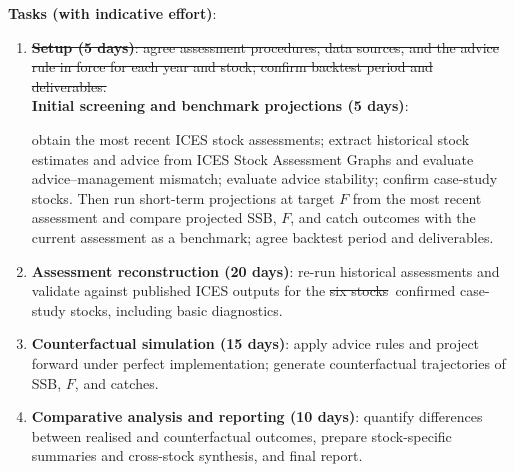 \documentclass[11pt,a4paper]{extarticle}
\newcommand{\removed}[1]{\sout{#1}}
\newcommand{\addedinline}[1]{\colorbox{yellow!35}{#1}}
\newcommand{\added}[1]{%
	\par\vspace{0.3em}\noindent
	\colorbox{yellow!35}{\parbox{\dimexpr\linewidth-2\fboxsep-2\fboxrule\relax}{#1}}%
	\par\vspace{0.3em}%
}
\newcommand{\replaced}[2]{\removed{#1}\ \addedinline{#2}}
\begin{document}
\textbf{Tasks (with indicative effort)}:
\begin{enumerate}
	\item \removed{%
	\textbf{Setup (5 days)}:
	agree assessment procedures, data sources, and the advice rule in force
	for each year and stock; confirm backtest period and deliverables.%
	}\\
	\addedinline{\textbf{Initial screening and benchmark projections (5 days)}:}
	\added{%
	obtain the most recent ICES stock assessments; extract historical stock
	estimates and advice from ICES Stock Assessment Graphs and evaluate
	advice--management mismatch; evaluate advice stability; confirm case-study
	stocks. Then run short-term projections at target $F$ from the most recent
	assessment and compare projected SSB, $F$, and catch outcomes with the
	current assessment as a benchmark; agree backtest period and deliverables.%
	}
	
	\item \textbf{Assessment reconstruction (20 days)}:
	re-run historical assessments and validate against published ICES outputs
	for the \replaced{six stocks}{confirmed case-study stocks}, including basic diagnostics.
	
	\item \textbf{Counterfactual simulation (15 days)}:
	apply advice rules and project forward under perfect implementation;
	generate counterfactual trajectories of SSB, $F$, and catches.
	
	\item \textbf{Comparative analysis and reporting (10 days)}:
	quantify differences between realised and counterfactual outcomes, prepare
	stock-specific summaries and cross-stock synthesis, and final report.
\end{enumerate}

	
\end{document}
